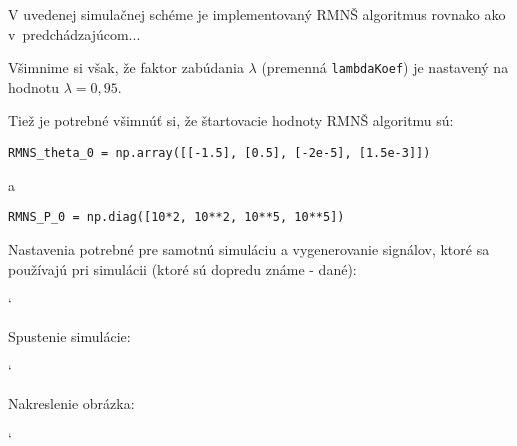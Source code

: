 \documentclass[a4paper, 10pt, ]{article}
\begin{document}
\noindent
V uvedenej simulačnej schéme je implementovaný RMNŠ algoritmus rovnako ako v~predchádzajúcom...

Všimnime si však, že faktor zabúdania $\lambda$ (premenná \lstinline{lambdaKoef}) je nastavený na hodnotu $\lambda = 0,95$.

Tiež je potrebné všimnúť si, že štartovacie hodnoty RMNŠ algoritmu sú:

\noindent
\lstinline{RMNS_theta_0 = np.array([[-1.5], [0.5], [-2e-5], [1.5e-3]])}

\noindent
a

\noindent
\lstinline{RMNS_P_0 = np.diag([10*2, 10**2, 10**5, 10**5])}

\noindent
Nastavenia potrebné pre samotnú simuláciu a vygenerovanie signálov, ktoré sa používajú pri simulácii (ktoré sú dopredu známe - dané):


{\catcode`

}

\noindent
Spustenie simulácie:


{\catcode`

}

\noindent
Nakreslenie obrázka:

{\catcode`

}

\begin{centering}


    \vspace{-2mm}

    \figcaption{}

    \vspace{2mm}

    \label{figsc_ar03_fig04_0}

\end{centering}
\end{document}
